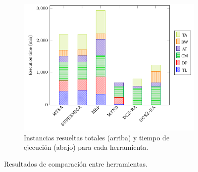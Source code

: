 \begin{figure}[th]
\begin{subfigure}{0.5\textwidth}
        \includegraphics[width=\linewidth]{figures/benchmark/tools_time.pdf}
        \caption{Instancias resueltas totales (arriba) y tiempo de ejecución (abajo) para cada herramienta.}
        \label{fig:tools:results:time}
    \end{subfigure}
\caption{Resultados de comparación entre herramientas.}
\label{fig:tools:results}
\end{figure}
